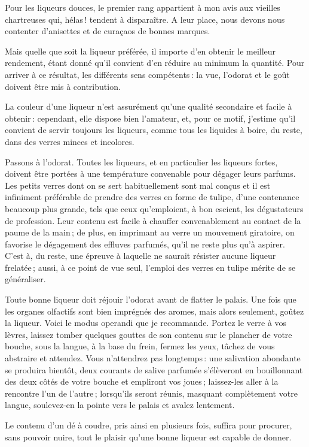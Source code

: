 Pour les liqueurs douces, le premier rang appartient à mon avis aux vieilles
chartreuses qui, hélas ! tendent à disparaître. A leur place, nous devons nous
contenter d'anisettes et de curaçaos de bonnes marques.

Mais quelle que soit la liqueur préférée, il importe d'en obtenir le meilleur
rendement, étant donné qu'il convient d'en réduire au minimum la quantité. Pour
arriver à ce résultat, les différents sens compétents : la vue, l'odorat et le
goût doivent être mis à contribution.

La couleur d'une liqueur n'est assurément qu'une qualité secondaire et facile
à obtenir : cependant, elle dispose bien l'amateur, et, pour ce motif, j'estime
qu'il convient de servir toujours les liqueurs, comme tous les liquides
à boire, du reste, dans des verres minces et incolores.

Passons à l'odorat. Toutes les liqueurs, et en particulier les liqueurs fortes,
doivent être portées à une température convenable pour dégager leurs parfums.
Les petits verres dont on se sert habituellement sont mal conçus et il est
infiniment préférable de prendre des verres en forme de tulipe, d'une
contenance beaucoup plus grande, tels que ceux qu'emploient, à bon escient, les
dégustateurs de profession. Leur contenu est facile à chauffer convenablement
au contact de la paume de la main ; de plus, en imprimant au verre un mouvement
giratoire, on favorise le dégagement des effluves parfumés, qu'il ne reste plus
qu'à aspirer. C'est à, du reste, une épreuve à laquelle ne saurait résister
aucune liqueur frelatée ; aussi, à ce point de vue seul, l'emploi des verres en
tulipe mérite de se généraliser.

Toute bonne liqueur doit réjouir l’odorat avant de flatter le palais. Une fois
que les organes olfactifs sont bien imprégnés des aromes, mais alors seulement,
goûtez la liqueur. Voici le modus operandi que je recommande. Portez le verre
à vos lèvres, laissez tomber quelques gouttes de son contenu sur le plancher de
votre bouche, sous la langue, à la base du frein, fermez les yeux, tâchez de
vous abstraire et attendez. Vous n'attendrez pas longtemps : une salivation
abondante se produira bientôt, deux courants de salive parfumée s'élèveront en
bouillonnant des deux côtés de votre bouche et empliront vos joues ;
laissez-les aller à la rencontre l'un de l'autre ; lorsqu'ils seront réunis,
masquant complètement votre langue, soulevez-en la pointe vers le palais et
avalez lentement.

Le contenu d'un dé à coudre, pris ainsi en plusieurs fois, suffira pour procurer,
sans pouvoir nuire, tout le plaisir qu'une bonne liqueur est capable de donner.
